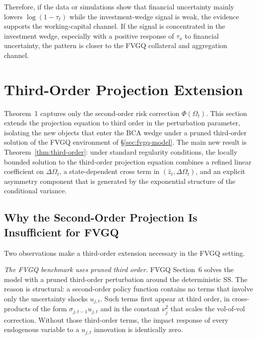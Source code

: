 \documentclass[11pt]{article}
\theoremstyle{plain}
\theoremstyle{definition}
\begin{document}
Therefore, if the data or simulations show that financial uncertainty mainly
lowers $\log(1-\tau_\ell)$ while the investment-wedge signal is weak, the
evidence supports the working-capital channel. If the signal is concentrated in
the investment wedge, especially with a positive response of $\tau_x$ to
financial uncertainty, the pattern is closer to the FVGQ collateral and
aggregation channel.

\section{Third-Order Projection Extension}
\label{sec:third-order-projection}

Theorem~1 captures only the second-order risk correction $\Phi(\Omega_t)$. This
section extends the projection equation to third order in the perturbation
parameter, isolating the new objects that enter the BCA wedge under a pruned
third-order solution of the FVGQ environment of §\ref{sec:fvgq-model}. The main
new result is Theorem~\ref{thm:third-order}: under standard regularity
conditions, the locally bounded solution to the third-order projection equation
combines a refined linear coefficient on $\Delta\Omega_t$, a state-dependent
cross term in $(\hat z_t,\Delta\Omega_t)$, and an explicit asymmetry component
that is generated by the exponential structure of the conditional variance.

\subsection{Why the Second-Order Projection Is Insufficient for FVGQ}

Two observations make a third-order extension necessary in the FVGQ setting.

\medskip

\noindent\textit{The FVGQ benchmark uses pruned third order.} FVGQ Section~6
solves the model with a pruned third-order perturbation around the
deterministic SS. The reason is structural: a second-order policy function
contains no terms that involve only the uncertainty shocks $u_{j,t}$. Such
terms first appear at third order, in cross-products of the form
$\sigma_{j,t-1} u_{j,t}$ and in the constant $\nu_j^2$ that scales the vol-of-vol
correction. Without those third-order terms, the impact response of every
endogenous variable to a $u_{j,t}$ innovation is identically zero.

\medskip
\end{document}
